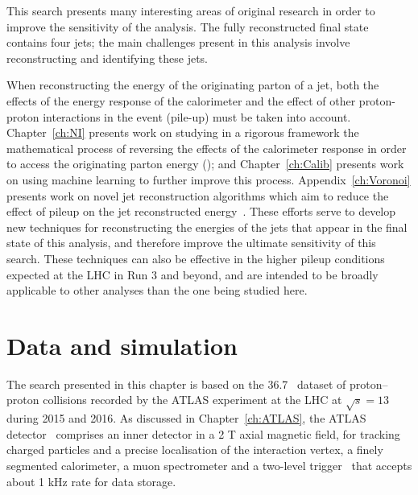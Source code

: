 This search presents many interesting areas of original research in order to improve the sensitivity of the analysis.
The fully reconstructed final state contains four jets;
the main challenges present in this analysis involve reconstructing and identifying these jets.

When reconstructing the energy of the originating parton of a jet, both the effects of the energy response of the calorimeter and the effect of other proton-proton interactions in the event (pile-up) must be taken into account.
Chapter~\ref{ch:NI} presents work on studying in a rigorous framework the mathematical process of reversing the effects of the calorimeter response in order to access the originating parton energy (\cite{Cukierman:2016dkb});
and Chapter~\ref{ch:Calib} presents work on using machine learning to further improve this process.
Appendix~\ref{ch:Voronoi} presents work on novel jet reconstruction algorithms which aim to reduce the effect of pileup on the jet reconstructed energy~\cite{ATLAS-CONF-2017-065}.
These efforts serve to develop new techniques for reconstructing the energies of the jets that appear in the final state of this analysis, and therefore improve the ultimate sensitivity of this search.
These techniques can also be effective in the higher pileup conditions expected at the LHC in Run 3 and beyond, and are intended to be broadly applicable to other analyses than the one being studied here. 

\section{Data and simulation}
The search presented in this chapter is based on the 36.7~\ifb{} dataset of proton--proton collisions
recorded by the ATLAS experiment at the LHC at $\sqrt{s}=13$ \TeV{} during 2015 and 2016.
As discussed in Chapter~\ref{ch:ATLAS}, the ATLAS detector~\cite{PERF-2007-01} comprises an inner detector in a 2 T axial magnetic field, 
for tracking charged particles and a precise localisation of the interaction vertex, 
a finely segmented calorimeter, a muon spectrometer and a two-level trigger~\cite{TRIG-2016-01} that
accepts about 1 kHz rate for data storage.

